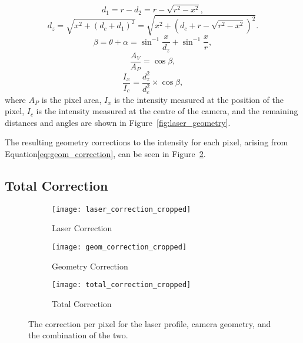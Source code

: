\begin{equation} \label{eq:geom_distance1}
d_1 = r - d_2 = r - \sqrt{r^2 - x^2},
\end{equation}
\begin{equation} \label{eq:geom_distance2}
d_z = \sqrt{x^2 + (d_c + d_1)^2} = \sqrt{x^2 + (d_c + r - \sqrt{r^2 - x^2})^2}.
\end{equation}
\begin{equation} \label{eq:viewing_area1}
\beta = \theta + \alpha = \sin^{-1}{\frac{x}{d_z}} + \sin^{-1}{\frac{x}{r}},
\end{equation}
\begin{equation} \label{eq:viewing_area2}
\frac{A_V}{A_P} = \cos{\beta},
\end{equation}
\begin{equation} \label{eq:geom_correction}
\frac{I_x}{I_c} = \frac{d_z^2}{d_c^2} \times \cos{\beta},
\end{equation}
where $A_P$ is the pixel area, $I_x$ is the intensity measured at the position of the pixel, $I_c$ is the intensity measured at the centre of the camera, and the remaining distances and angles are shown in Figure~\ref{fig:laser_geometry}.

The resulting geometry corrections to the intensity for each pixel, arising from Equation\ref{eq:geom_correction}, can be seen in Figure~\ref{fig:geom_correction_cropped}. 

\subsection{Total Correction}

\begin{figure}
  \begin{subfigure}[b]{0.49\textwidth}
    \texttt{[image: laser\_correction\_cropped]}
    \caption{Laser Correction}
    \label{fig:laser_correction_cropped}
  \end{subfigure}
  \hfill
  \begin{subfigure}[b]{0.49\textwidth}
    \texttt{[image: geom\_correction\_cropped]}
    \caption{Geometry Correction}
    \label{fig:geom_correction_cropped}
  \end{subfigure}
  \centering
  \begin{subfigure}[b]{0.49\textwidth}
    \texttt{[image: total\_correction\_cropped]}
    \caption{Total Correction}
    \label{fig:total_correction_cropped}
  \end{subfigure}
  \caption[Illumination profile correction images.]{The correction per pixel for the laser profile, camera geometry, and the combination of the two.}
\end{figure}

